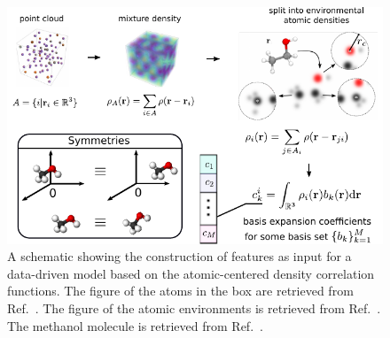 \begin{figure}
  \centering
  \includegraphics[width=\textwidth]{fig/atomistic_repr_schematic.pdf}
  \caption{A schematic showing the construction of features as input for a data-driven model based on the atomic-centered density correlation functions. The figure of the atoms in the box are retrieved from Ref.~\cite{noh2019inverse}. The figure of the atomic environments is retrieved from Ref.~\cite{willatt2019atom}. The methanol molecule is retrieved from Ref.~\cite{wiki:Alcohol_(chemistry)}.}
  \label{fig:acdc-scheme}
\end{figure}



